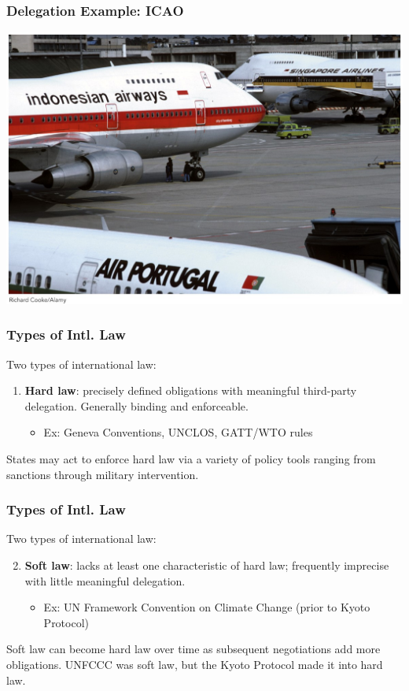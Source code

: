 \documentclass[handout]{beamer}
\begin{document}

\begin{frame} 
	\frametitle{\LARGE{Delegation Example: ICAO}}
	\centering
\includegraphics[width=\textwidth,height=\textheight,keepaspectratio]{ICAO.jpg}
\end{frame}

\begin{frame} 
	\frametitle{\LARGE{Types of Intl. Law}}
Two types of international law:
	\begin{enumerate}
		\item \textbf{Hard law}: precisely defined obligations with meaningful third-party delegation. Generally binding and enforceable. \pause
		\begin{itemize}
			\item Ex: Geneva Conventions, UNCLOS, GATT/WTO rules \pause
		\end{itemize}
	\end{enumerate}
States may act to enforce hard law via a variety of policy tools ranging from sanctions through military intervention.
\end{frame}

\begin{frame} 
	\frametitle{\LARGE{Types of Intl. Law}}
	Two types of international law:
	\begin{enumerate}
	  	\setcounter{enumi}{1}
		\item \textbf{Soft law}: lacks at least one characteristic of hard law; frequently imprecise with little meaningful delegation. \pause
		\begin{itemize}
			\item Ex: UN Framework Convention on Climate Change (prior to Kyoto Protocol) 
		\end{itemize}
	\end{enumerate}
	Soft law can become hard law over time as subsequent negotiations add more obligations. UNFCCC was soft law, but the Kyoto Protocol made it into hard law.
\end{frame}
\end{document}
